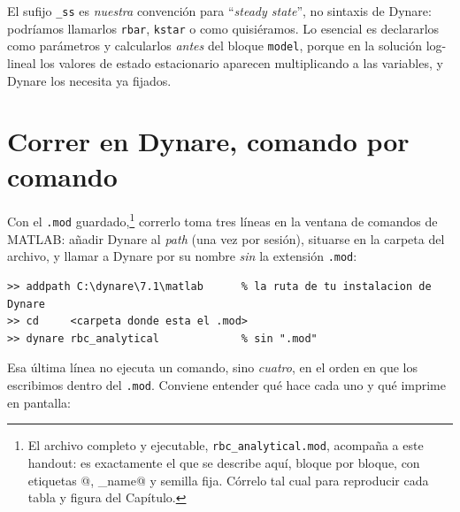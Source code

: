 \documentclass[11pt,a4paper]{report}
\newcounter{tcbrem}[section]
\renewcommand{\thetcbrem}{\thesection.\arabic{tcbrem}}
\newenvironment{remark}{%
  \refstepcounter{tcbrem}%
  \begin{tcolorbox}[remarkstyle, title={Observación~\thetcbrem}]}%
{\end{tcolorbox}}
\newcommand{\code}[1]{\texttt{#1}}
\begin{document}
\begin{remark}
El sufijo \code{\_ss} es \emph{nuestra} convención para ``\emph{steady state}'',
no sintaxis de Dynare: podríamos llamarlos \code{rbar}, \code{kstar} o como
quisiéramos. Lo esencial es declararlos como parámetros y calcularlos \emph{antes}
del bloque \code{model}, porque en la solución log-lineal los valores de estado
estacionario aparecen multiplicando a las variables, y Dynare los necesita ya
fijados.
\end{remark}

\section{Correr en Dynare, comando por comando}

Con el \code{.mod} guardado,\footnote{El archivo completo y ejecutable,
\code{rbc\_analytical.mod}, acompaña a este handout: es exactamente el que se
describe aquí, bloque por bloque, con etiquetas \lstinline@[name='...']@,
\lstinline@long_name@ y semilla fija. Córrelo tal cual para reproducir cada tabla y
figura del Capítulo.} correrlo toma tres líneas en la ventana de comandos de MATLAB:
añadir Dynare al \emph{path} (una vez por sesión), situarse en la carpeta del
archivo, y llamar a Dynare por su nombre \emph{sin} la extensión \code{.mod}:

\begin{lstlisting}[numbers=none,basicstyle=\ttfamily\footnotesize]
>> addpath C:\dynare\7.1\matlab      % la ruta de tu instalacion de Dynare
>> cd     <carpeta donde esta el .mod>
>> dynare rbc_analytical             % sin ".mod"
\end{lstlisting}

\noindent Esa última línea no ejecuta un comando, sino \emph{cuatro}, en el orden
en que los escribimos dentro del \code{.mod}. Conviene entender qué hace cada uno
y qué imprime en pantalla:
\end{document}
